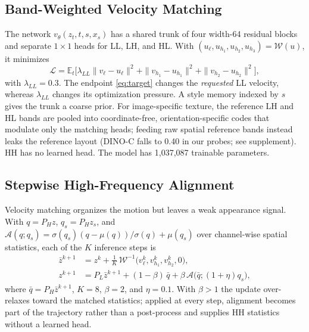 \documentclass[conference]{IEEEtran}
\newcommand{\dinoc}{DINO-C}
\begin{document}
\subsection{Band-Weighted Velocity Matching}
The network $v_\theta(z_t,t,s,x_s)$ has a shared trunk of four width-64 residual blocks and separate
$1{\times}1$ heads for LL, LH, and HL. With $(u_\ell,u_{h_1},u_{h_2},u_{h_3})=\mathcal W(u)$, it minimizes
\begin{equation}
\mathcal L=\mathbb E_{t}\big[\lambda_{LL}\|v_\ell-u_\ell\|^2+\|v_{h_1}-u_{h_1}\|^2+\|v_{h_2}-u_{h_2}\|^2\big],
\label{eq:loss}
\end{equation}
with $\lambda_{LL}=0.3$. The endpoint \eqref{eq:target} changes the \emph{requested} LL velocity, whereas
$\lambda_{LL}$ changes its optimization pressure. A style memory indexed by $s$ gives the trunk a coarse
prior. For image-specific texture, the reference LH and HL bands are pooled into coordinate-free,
orientation-specific codes that modulate only the matching heads; feeding raw spatial reference bands
instead leaks the reference layout (\dinoc{} falls to 0.40 in our probes; see supplement). HH has no
learned head. The model has 1{,}037{,}087 trainable parameters.

\subsection{Stepwise High-Frequency Alignment}
Velocity matching organizes the motion but leaves a weak appearance signal. With $q=P_Hz$, $q_s=P_Hz_s$,
and $\mathcal A(q;q_s)=\sigma(q_s)(q-\mu(q))/\sigma(q)+\mu(q_s)$ over channel-wise spatial statistics, each
of the $K$ inference steps is
\begin{equation}
\begin{aligned}
\bar z^{k+1}&=z^k+\tfrac1K\,\mathcal W^{-1}\big(v_\ell^k,v_{h_1}^k,v_{h_2}^k,0\big),\\
z^{k+1}&=P_L\bar z^{k+1}+(1-\beta)\,\bar q+\beta\,\mathcal A\big(\bar q;(1+\eta)q_s\big),
\end{aligned}
\label{eq:step}
\end{equation}
where $\bar q=P_H\bar z^{k+1}$, $K=8$, $\beta=2$, and $\eta=0.1$. With $\beta>1$ the update over-relaxes
toward the matched statistics; applied at every step, alignment becomes part of the trajectory rather than
a post-process and supplies HH statistics without a learned head.
\end{document}

